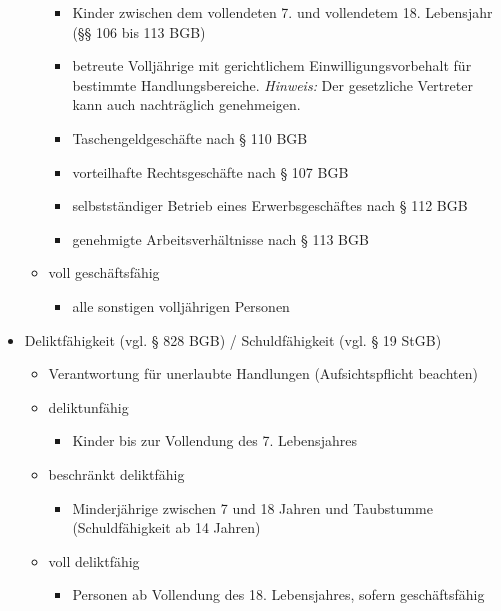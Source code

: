 \begin{itemize}
\begin{itemize}
				\begin{itemize}
					\item Kinder zwischen dem vollendeten 7. und vollendetem 18. Lebensjahr (§§ 106 bis 113 BGB)
					\item betreute Volljährige mit gerichtlichem Einwilligungsvorbehalt für bestimmte Handlungsbereiche. {\it Hinweis:} Der gesetzliche Vertreter kann auch nachträglich genehmeigen.
					\item Taschengeldgeschäfte nach § 110 BGB
					\item vorteilhafte Rechtsgeschäfte nach § 107 BGB
					\item selbstständiger Betrieb eines Erwerbsgeschäftes nach § 112 BGB
					\item genehmigte Arbeitsverhältnisse nach § 113 BGB
				\end{itemize}
			\item voll geschäftsfähig 
				\begin{itemize}
					\item alle sonstigen volljährigen Personen
				\end{itemize}
		\end{itemize}
	\item Deliktfähigkeit (vgl. § 828 BGB) / Schuldfähigkeit (vgl. § 19 StGB)
		\begin{itemize}
			\item Verantwortung für unerlaubte Handlungen (Aufsichtspflicht beachten)
		    \item deliktunfähig
		    	\begin{itemize}
		    		\item Kinder bis zur Vollendung des 7. Lebensjahres
		    	\end{itemize}
		    \item beschränkt deliktfähig
		    	\begin{itemize}
		    		\item Minderjährige zwischen 7 und 18 Jahren und Taubstumme (Schuldfähigkeit ab 14 Jahren)
		     	\end{itemize}
		     \item voll deliktfähig
		     	\begin{itemize}
		     		\item Personen ab Vollendung des 18. Lebensjahres, sofern geschäftsfähig
		     	\end{itemize}
		\end{itemize}
\end{itemize}

